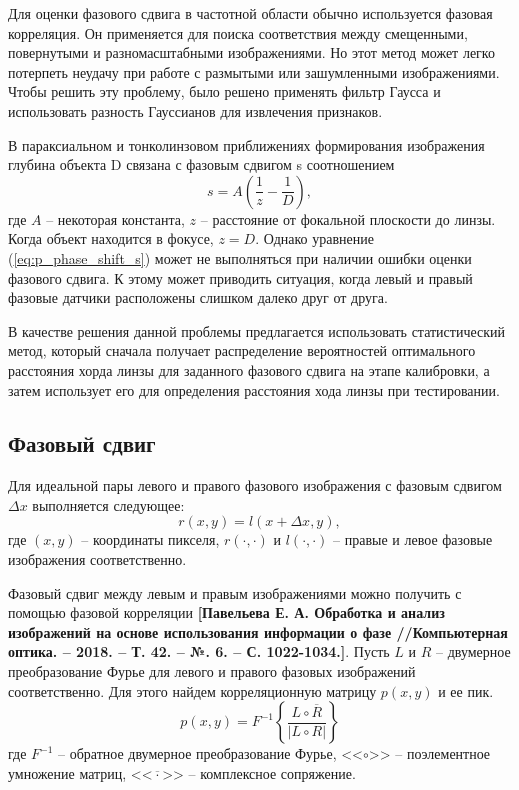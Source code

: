 Для оценки фазового сдвига в частотной области обычно используется фазовая корреляция. Он применяется для поиска соответствия между смещенными, повернутыми и разномасштабными изображениями. Но этот метод может легко потерпеть неудачу при работе с размытыми или зашумленными изображениями. Чтобы решить эту проблему, было решено применять фильтр Гаусса и использовать разность Гауссианов для извлечения признаков.

В параксиальном и тонколинзовом приближениях формирования изображения глубина объекта D связана с фазовым сдвигом s соотношением
\begin{equation}
	s = A\left( \frac{1}{z} - \frac{1}{D}\right),
	\label{eq:p_phase_shift_s}
\end{equation}
где $A$ -- некоторая константа, $z$ -- расстояние от фокальной плоскости до линзы. Когда объект находится в фокусе, $z = D$. Однако уравнение (\ref{eq:p_phase_shift_s}) может не выполняться при наличии ошибки оценки фазового сдвига. К этому может приводить ситуация, когда левый и правый фазовые датчики расположены слишком далеко друг от друга.

В качестве решения данной проблемы предлагается использовать статистический метод, который сначала получает распределение вероятностей оптимального расстояния хорда линзы для заданного фазового сдвига на этапе калибровки, а затем использует его для определения расстояния хода линзы при тестировании.

\subsection{Фазовый сдвиг}
Для идеальной пары левого и правого фазового изображения с фазовым сдвигом $\Delta x$ выполняется следующее:
\begin{equation}
	r(x, y) = l(x + \Delta x, y),
\end{equation}
где $(x, y)$ -- координаты пикселя, $r(\cdot,\cdot)$ и $l(\cdot,\cdot)$ -- правые и левое фазовые изображения соответственно.

Фазовый сдвиг между левым и правым изображениями можно получить с помощью фазовой корреляции \textbf{[Павельева Е. А. Обработка и анализ изображений на основе использования информации о фазе //Компьютерная оптика. – 2018. – Т. 42. – №. 6. – С. 1022-1034.]}. Пусть $L$ и $R$ -- двумерное преобразование Фурье для левого и правого фазовых изображений соответственно. Для этого найдем корреляционную матрицу $p(x, y)$ и ее пик.
\begin{equation}
	p(x, y) = F^{-1} \left\{ \frac{L \circ \overline{R}}{\left| L \circ R \right|} \right\}
\end{equation}
где $F^{-1}$ -- обратное двумерное преобразование Фурье, <<$\circ$>> -- поэлементное умножение матриц, <<$\overline{\cdot}$>> -- комплексное сопряжение.

